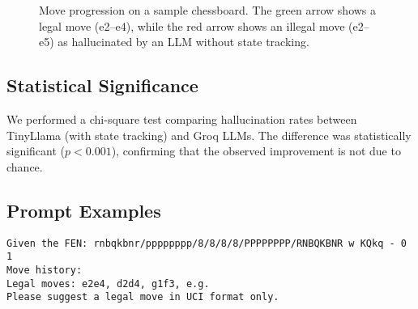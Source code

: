 \documentclass[conference]{IEEEtran}
\begin{document}
\begin{figure}[htbp]
\centering
\begin{adjustbox}{max width=\linewidth, center}
\end{adjustbox}
\caption{Move progression on a sample chessboard. The green arrow shows a legal move (e2--e4), while the red arrow shows an illegal move (e2--e5) as hallucinated by an LLM without state tracking.}
\label{fig:move-progression}
\end{figure}


\subsection{Statistical Significance}
We performed a chi-square test comparing hallucination rates between TinyLlama (with state tracking) and Groq LLMs. The difference was statistically significant ($p < 0.001$), confirming that the observed improvement is not due to chance.

\subsection{Prompt Examples}
\begin{lstlisting}[caption={TinyLlama (Final Prompt)},label={lst:prompt-tinyllama}]
Given the FEN: rnbqkbnr/pppppppp/8/8/8/8/PPPPPPPP/RNBQKBNR w KQkq - 0 1
Move history: 
Legal moves: e2e4, d2d4, g1f3, e.g.
Please suggest a legal move in UCI format only.
\end{lstlisting}
\end{document}
